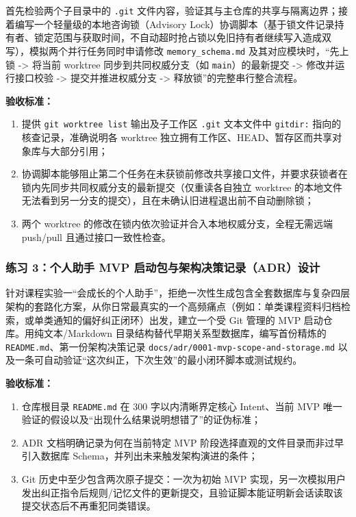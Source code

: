 \documentclass[UTF8,a4paper,11pt,fontset=fandol]{ctexart}
\begin{document}
首先检验两个子目录中的 \texttt{.git} 文件内容，验证其与主仓库的共享与隔离边界；接着编写一个轻量级的本地咨询锁（Advisory Lock）协调脚本（基于锁文件记录持有者、锁定范围与获取时间，不自动超时抢占锁以免旧持有者继续写入造成双写），模拟两个并行任务同时申请修改 \texttt{memory\_schema.md} 及其对应模块时，“先上锁 -> 将当前 worktree 同步到共同权威分支（如 \texttt{main}）的最新提交 -> 修改并运行接口校验 -> 提交并推进权威分支 -> 释放锁”的完整串行整合流程。

\par{}\textbf{验收标准：}

\begin{enumerate}
\item 提供 \texttt{git worktree list} 输出及子工作区 \texttt{.git} 文本文件中 \texttt{gitdir:} 指向的核查记录，准确说明各 worktree 独立拥有工作区、HEAD、暂存区而共享对象库与大部分引用；

\item 协调脚本能够阻止第二个任务在未获锁前修改共享接口文件，并要求获锁者在锁内先同步共同权威分支的最新提交（仅重读各自独立 worktree 的本地文件无法看到另一分支的提交），且在未确认旧进程退出前不自动删除锁；

\item 两个 worktree 的修改在锁内依次验证并合入本地权威分支，全程无需远端 push/pull 且通过接口一致性检查。
\end{enumerate}

\subsubsection*{练习 3：个人助手 MVP 启动包与架构决策记录（ADR）设计}

针对课程实验一“会成长的个人助手”，拒绝一次性生成包含全套数据库与复杂四层架构的套路化方案，从你日常最真实的一个高频痛点（例如：单类课程资料归档检索，或单类通知的偏好纠正闭环）出发，建立一个受 Git 管理的 MVP 启动仓库。用纯文本/Markdown 目录结构替代早期关系型数据库，编写首份精炼的 \texttt{README.md}、第一份架构决策记录 \texttt{docs/adr/0001-mvp-scope-and-storage.md} 以及一条可自动验证“这次纠正，下次生效”的最小闭环脚本或测试规约。

\par{}\textbf{验收标准：}

\begin{enumerate}
\item 仓库根目录 \texttt{README.md} 在 300 字以内清晰界定核心 Intent、当前 MVP 唯一验证的假设以及“出现什么结果说明想错了”的证伪标准；

\item ADR 文档明确记录为何在当前特定 MVP 阶段选择直观的文件目录而非过早引入数据库 Schema，并列出未来触发架构演进的条件；

\item Git 历史中至少包含两次原子提交：一次为初始 MVP 实现，另一次模拟用户发出纠正指令后规则/记忆文件的更新提交，且验证脚本能证明新会话读取该提交状态后不再重犯同类错误。
\end{enumerate}
\end{document}
